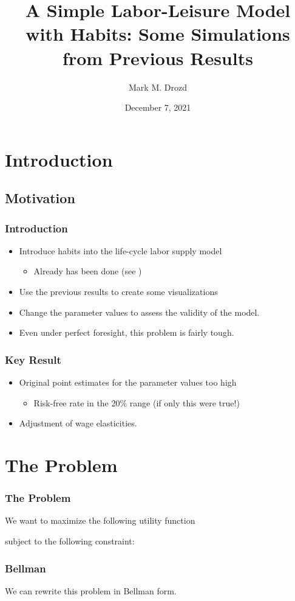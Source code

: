 \documentclass[pdflatex]{beamer}
\title[Project MMD]{A Simple Labor-Leisure Model with Habits: Some Simulations from Previous Results}
\author[Drozd]{Mark M. Drozd}
\institute[JHU]{Johns Hopkins University}
\date[\today]{December 7, 2021}
\begin{document}


\begin{frame}[plain]
  \titlepage
\end{frame}


\section{Introduction}
\subsection{Motivation}

\begin{frame}
\frametitle{Introduction}

\begin{itemize}
\item Introduce habits into the life-cycle labor supply model
  \begin{itemize}
  \item Already has been done (see \cite{bover1991relaxing})
  \end{itemize}
\item Use the previous results to create some visualizations
  \item Change the parameter values to assess the validity of the model. 
\item Even under perfect foresight, this problem is fairly tough.
  \end{itemize}
\end{frame}

\begin{frame}
  \frametitle{Key Result}
\begin{itemize}
\item Original point estimates for the parameter values too high
  \begin{itemize}
  \item Risk-free rate in the 20\% range (if only this were true!)
  \end{itemize}
 \item Adjustment of wage elasticities.
\end{itemize}
\end{frame}

\section{The Problem}
\begin{frame}
\frametitle{The Problem}
We want to maximize the following utility function

subject to the following constraint:


\end{frame}
\begin{frame}
  \frametitle{Bellman}
We can rewrite this problem in Bellman form.
\end{frame}
\end{document}
